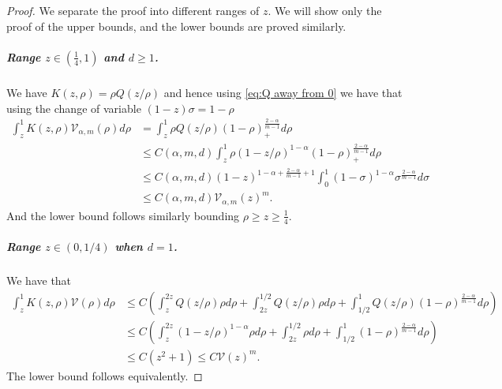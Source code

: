 \documentclass[a4paper]{article}
\theoremstyle{definition}
\begin{document}
\begin{proof}
We separate the proof into different ranges of $z$. We will show only the proof of the upper bounds, and the lower bounds are proved similarly.

\subparagraph{Range $z \in (\frac 1 4,1)$ and $d \ge 1$.}
We have $K(z,\rho) = \rho Q(z/\rho)$ and hence using \eqref{eq:Q away from 0} we have that using the change of variable $(1-z) \sigma = 1-\rho$
\begin{align*}
  \int_z^1 K(z,\rho) \mathcal V_{\alpha,m} (\rho) d \rho
  & =   \int_z^1 \rho Q(z/\rho) (1-\rho)_+^{\frac{2-\alpha}{m-1}} d \rho
  \\
  & \le  C(\alpha,m,d)   \int_z^1 \rho (1-z/\rho)^{1-\alpha} (1-\rho)_+^{\frac{2-\alpha}{m-1}} d \rho
  \\
  & \le  C(\alpha,m,d) (1-z)^{1-\alpha + \frac{2-\alpha}{m-1} + 1} \int_0^1 (1 - \sigma)^{1-\alpha} \sigma^{\frac{2-\alpha}{m-1}} d \sigma
  \\
  & \le {C(\alpha,m,d) } \mathcal V_{\alpha,m}(z)^m.
\end{align*}
And the lower bound follows similarly bounding $\rho \ge z \ge \frac 1 4$.

\subparagraph{Range $z \in (0,1/4)$ when $d = 1$.}
We have that
\begin{align*}
  \int_z^1 K(z,\rho) \mathcal V (\rho) d \rho
  & \le C \left(  \int_z^{2z}  Q(z/ \rho) \rho d \rho + \int_{2z}^{1/2}   Q(z/\rho) \rho d \rho + \int_{1/2}^{1}  Q(z/\rho) (1-\rho)^{\frac{2-\alpha}{m-1}} d \rho
  \right)
  \\
  & \le C\left( \int_z^{2z}  (1 - z/\rho)^{1-\alpha}  \rho d \rho + \int_{2z}^{1/2}\rho d \rho+ \int_{1/2}^{1} (1-\rho)^{\frac{2-\alpha}{m-1}} d \rho
  \right)
  \\
  & \le C \left(
    z^2
  +  1 \right)
  \le C \mathcal V(z)^m.
\end{align*}
The lower bound follows equivalently.


\end{proof}
\end{document}
